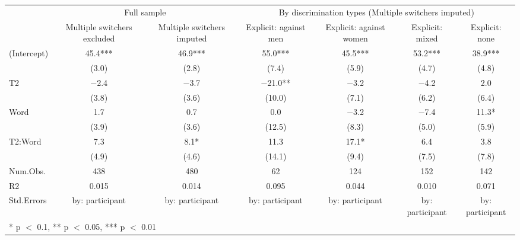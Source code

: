\begin{table}
\centering
\begin{tabular}[t]{lcccccc}
\toprule
\multicolumn{1}{c}{ } & \multicolumn{2}{c}{Full sample} & \multicolumn{4}{c}{By discrimination types (Multiple switchers imputed)} \\
\cmidrule(l{3pt}r{3pt}){2-3} \cmidrule(l{3pt}r{3pt}){4-7}
  & Multiple switchers excluded & Multiple switchers imputed & Explicit: against men & Explicit: against women & Explicit: mixed & Explicit: none\\
\midrule
(Intercept) & \num{45.4}*** & \num{46.9}*** & \num{55.0}*** & \num{45.5}*** & \num{53.2}*** & \num{38.9}***\\
 & (\num{3.0}) & (\num{2.8}) & (\num{7.4}) & (\num{5.9}) & (\num{4.7}) & (\num{4.8})\\
T2 & \num{-2.4} & \num{-3.7} & \num{-21.0}** & \num{-3.2} & \num{-4.2} & \num{2.0}\\
 & (\num{3.8}) & (\num{3.6}) & (\num{10.0}) & (\num{7.1}) & (\num{6.2}) & (\num{6.4})\\
Word & \num{1.7} & \num{0.7} & \num{0.0} & \num{-3.2} & \num{-7.4} & \num{11.3}*\\
 & (\num{3.9}) & (\num{3.6}) & (\num{12.5}) & (\num{8.3}) & (\num{5.0}) & (\num{5.9})\\
T2:Word & \num{7.3} & \num{8.1}* & \num{11.3} & \num{17.1}* & \num{6.4} & \num{3.8}\\
 & (\num{4.9}) & (\num{4.6}) & (\num{14.1}) & (\num{9.4}) & (\num{7.5}) & (\num{7.8})\\
\midrule
Num.Obs. & \num{438} & \num{480} & \num{62} & \num{124} & \num{152} & \num{142}\\
R2 & \num{0.015} & \num{0.014} & \num{0.095} & \num{0.044} & \num{0.010} & \num{0.071}\\
Std.Errors & by: participant & by: participant & by: participant & by: participant & by: participant & by: participant\\
\bottomrule
\multicolumn{7}{l}{\rule{0pt}{1em}* p $<$ 0.1, ** p $<$ 0.05, *** p $<$ 0.01}\\
\end{tabular}
\end{table}
